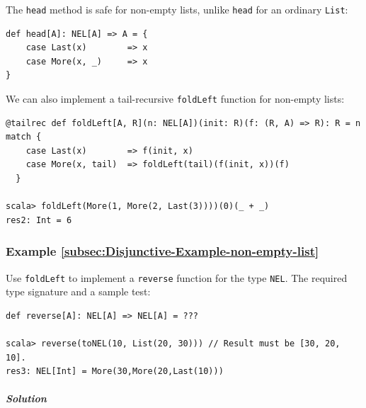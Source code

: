 The \lstinline!head! method is safe for non-empty lists, unlike \lstinline!head!
for an ordinary \lstinline!List!:
\begin{lstlisting}
def head[A]: NEL[A] => A = {
    case Last(x)        => x
    case More(x, _)     => x
}
\end{lstlisting}

We can also implement a tail-recursive \lstinline!foldLeft! function
for non-empty lists:
\begin{lstlisting}
@tailrec def foldLeft[A, R](n: NEL[A])(init: R)(f: (R, A) => R): R = n match {
    case Last(x)        => f(init, x)
    case More(x, tail)  => foldLeft(tail)(f(init, x))(f)
  }

scala> foldLeft(More(1, More(2, Last(3))))(0)(_ + _)
res2: Int = 6
\end{lstlisting}


\subsubsection{Example \label{subsec:Disjunctive-Example-non-empty-list}\ref{subsec:Disjunctive-Example-non-empty-list}}

Use \lstinline!foldLeft! to implement a \lstinline!reverse! function
for the type \lstinline!NEL!. The required type signature and a sample
test:
\begin{lstlisting}
def reverse[A]: NEL[A] => NEL[A] = ???

scala> reverse(toNEL(10, List(20, 30))) // Result must be [30, 20, 10].
res3: NEL[Int] = More(30,More(20,Last(10)))
\end{lstlisting}


\subparagraph{Solution}

